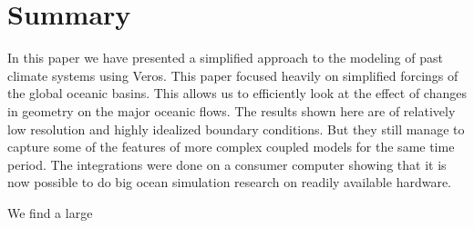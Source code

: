 \section{Summary}
In this paper we have presented a simplified approach to the modeling of past climate systems using Veros. This paper focused heavily on simplified forcings of the global oceanic basins. This allows us  to efficiently look at the effect of changes in geometry on the major oceanic flows. The results shown here are of relatively low resolution and highly idealized boundary conditions. But they still manage to capture some of the features of more complex coupled models for the same time period. The integrations were done on a consumer computer showing that it is now possible to do big ocean simulation research on readily available hardware.

We find a large 